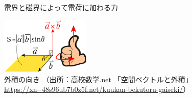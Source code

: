 \documentclass[dvipdfmx, 8pt, aspectratio=169]{beamer}
\begin{document}
\begin{frame}[t]
\begin{columns}[t]
\begin{column}{0.4\textwidth}
\begin{figure}[t]

        \caption{電界と磁界によって電荷に加わる力}
      \end{figure}

      \begin{figure}[t]
        \centering
        \includegraphics[width=0.38\textwidth]{./img/gaiseki.png}
        \caption{外積の向き
          （出所：高校数学.net 「空間ベクトルと外積」 \url{https://xn--48s96ub7b0z5f.net/kuukan-bekutoru-gaiseki/}）
        }
      \end{figure}



    \end{column}

  \end{columns}

\end{frame}
\end{document}
